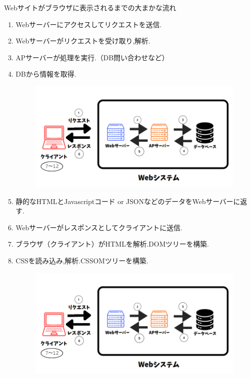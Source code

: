 \documentclass[aspectratio=169]{beamer}
\begin{document}
\begin{frame}[allowframebreaks]{Webサイトがブラウザに表示されるまでの大まかな流れ}
    \begin{enumerate}
        \setlength{\parskip}{1em}
        \item Webサーバーにアクセスしてリクエストを送信.
        \item Webサーバーがリクエストを受け取り,解析.
        \item APサーバーが処理を実行.（DB問い合わせなど）
        \item DBから情報を取得.
        \begin{figure}
            \includegraphics[scale=0.21]{webfloat.png}
        \end{figure}
        \item 静的なHTMLとJavascriptコード or JSONなどのデータをWebサーバーに返す.
        \item Webサーバーがレスポンスとしてクライアントに送信.
        \item ブラウザ（クライアント）がHTMLを解析.DOMツリーを構築.
        \item CSSを読み込み,解析.CSSOMツリーを構築.
        \begin{figure}
            \includegraphics[scale=0.19]{webfloat.png}

\end{figure}
\end{enumerate}
\end{frame}
\end{document}
